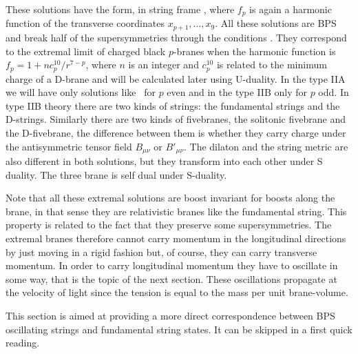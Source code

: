 These solutions  have the form,
in string frame \hs ,
\eqn{}
where $f_p$ is again a harmonic function of the
transverse coordinates $x_{p+1},...,x_9 $. 
All these solutions are BPS and break half of the
supersymmetries through the conditions \susydbrane .
 They correspond to the 
extremal limit of charged black $p$-branes when
the harmonic function is $f_p = 1 + n c_p^{10}  /r^{7-p} $,
where $n$ is an integer and $c_p^{10}$ is related to the 
minimum charge of a D-brane and will be  calculated later using
U-duality.
In the type IIA we will have only solutions like
\pbrane\ for $p$ even and in the type IIB only for $p$ odd.
In  type IIB theory there are two kinds of strings:
the fundamental strings and the D-strings. Similarly 
there are two kinds of fivebranes, the solitonic
fivebrane and the D-fivebrane, the difference
between them is whether they carry charge
under the antisymmetric tensor field
$B_{\mu\nu}$ or $B'_{\mu\nu}$. The dilaton and the
string metric are also different in both solutions, but 
 they transform into each other under S duality.
The three brane is self dual under S-duality.

Note that all these extremal solutions are boost invariant
for boosts along the brane, in that sense they 
are relativistic branes like the fundamental string.
This property is related  to the
fact that they preserve some supersymmetries.
The extremal branes therefore cannot carry momentum in the
longitudinal directions by just moving in a rigid fashion
but, of course, they can carry transverse momentum. 
In order to carry longitudinal  momentum they  have to oscillate
in some way, that is the topic of the next section.
These oscillations propagate at the velocity of light since the
tension is equal to the mass per unit brane-volume. 




This section is aimed at providing a more direct 
correspondence  between BPS oscillating strings 
and fundamental string states. It can be skipped 
in a first quick reading. 

